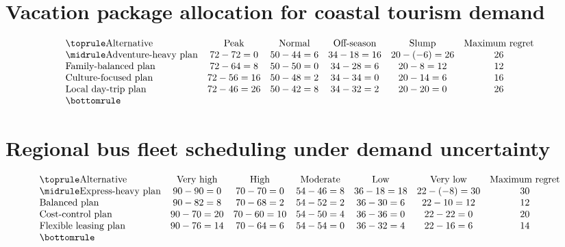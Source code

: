 \section{Vacation package allocation for coastal tourism demand}
\[\begin{array}{lccccc}
			\toprule
			\text{Alternative} & \text{Peak} & \text{Normal} & \text{Off-season} & \text{Slump} & \text{Maximum regret}\\
			\midrule
			\text{Adventure-heavy plan} & 72-72=0 & 50-44=6 & 34-18=16 & 20-(-6)=26 & 26\\
			\text{Family-balanced plan} & 72-64=8 & 50-50=0 & 34-28=6 & 20-8=12 & 12\\
			\text{Culture-focused plan} & 72-56=16 & 50-48=2 & 34-34=0 & 20-14=6 & 16\\
			\text{Local day-trip plan} & 72-46=26 & 50-42=8 & 34-32=2 & 20-20=0 & 26\\
			\bottomrule
		\end{array}\]

\section{Regional bus fleet scheduling under demand uncertainty}
\[\begin{array}{lcccccc}
			\toprule
			\text{Alternative} & \text{Very high} & \text{High} & \text{Moderate} & \text{Low} & \text{Very low} & \text{Maximum regret}\\
			\midrule
			\text{Express-heavy plan} & 90-90=0 & 70-70=0 & 54-46=8 & 36-18=18 & 22-(-8)=30 & 30\\
			\text{Balanced plan} & 90-82=8 & 70-68=2 & 54-52=2 & 36-30=6 & 22-10=12 & 12\\
			\text{Cost-control plan} & 90-70=20 & 70-60=10 & 54-50=4 & 36-36=0 & 22-22=0 & 20\\
			\text{Flexible leasing plan} & 90-76=14 & 70-64=6 & 54-54=0 & 36-32=4 & 22-16=6 & 14\\
			\bottomrule
		\end{array}\]


